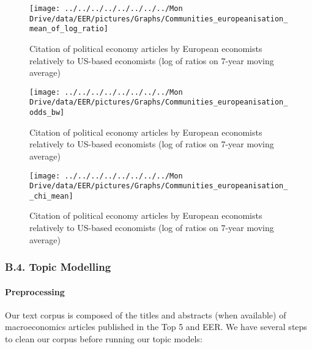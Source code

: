\documentclass[
  12pt,
  onecolumn]{article}
\begin{document}
\begin{figure}[h]

{\centering \texttt{[image: ../../../../../../../../Mon Drive/data/EER/pictures/Graphs/Communities\_europeanisation\_mean\_of\_log\_ratio]} 

}

\caption{Citation of political economy articles by European economists relatively to US-based economists (log of ratios on 7-year moving average)}\label{fig:plot-mean-log-ratios}
\end{figure}

\begin{figure}[h]

{\centering \texttt{[image: ../../../../../../../../Mon Drive/data/EER/pictures/Graphs/Communities\_europeanisation\_odds\_bw]} 

}

\caption{Citation of political economy articles by European economists relatively to US-based economists (log of ratios on 7-year moving average)}\label{fig:plot-all-nodes-ratios}
\end{figure}

\begin{figure}[h]

{\centering \texttt{[image: ../../../../../../../../Mon Drive/data/EER/pictures/Graphs/Communities\_europeanisation\_\_chi\_mean]} 

}

\caption{Citation of political economy articles by European economists relatively to US-based economists (log of ratios on 7-year moving average)}\label{fig:plot-chi-two-mean}
\end{figure}

\hypertarget{topic}{%
\subsubsection*{B.4. Topic Modelling}\label{topic}}

\hypertarget{preprocessing}{%
\paragraph*{Preprocessing}\label{preprocessing}}

Our text corpus is composed of the titles and abstracts (when available)
of macroeconomics articles published in the Top 5 and EER. We have
several steps to clean our corpus before running our topic models:
\end{document}
